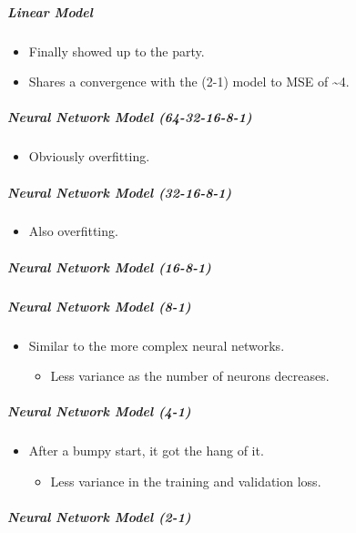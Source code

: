 \documentclass[11pt]{article}
\providecommand{\tightlist}{%
      \setlength{\itemsep}{0pt}\setlength{\parskip}{0pt}}
\begin{document}
\subparagraph{Linear Model}\label{linear-model}

\begin{itemize}
\tightlist
\item
  Finally showed up to the party.
\item
  Shares a convergence with the (2-1) model to MSE of \textasciitilde4.
\end{itemize}

\subparagraph{Neural Network Model
(64-32-16-8-1)}\label{neural-network-model-64-32-16-8-1}

\begin{itemize}
\tightlist
\item
  Obviously overfitting.
\end{itemize}

\subparagraph{Neural Network Model
(32-16-8-1)}\label{neural-network-model-32-16-8-1}

\begin{itemize}
\tightlist
\item
  Also overfitting.
\end{itemize}

\subparagraph{Neural Network Model
(16-8-1)}\label{neural-network-model-16-8-1}

\subparagraph{Neural Network Model
(8-1)}\label{neural-network-model-8-1}

\begin{itemize}
\tightlist
\item
  Similar to the more complex neural networks.

  \begin{itemize}
  \tightlist
  \item
    Less variance as the number of neurons decreases.
  \end{itemize}
\end{itemize}

\subparagraph{Neural Network Model
(4-1)}\label{neural-network-model-4-1}

\begin{itemize}
\tightlist
\item
  After a bumpy start, it got the hang of it.

  \begin{itemize}
  \tightlist
  \item
    Less variance in the training and validation loss.
  \end{itemize}
\end{itemize}

\subparagraph{Neural Network Model
(2-1)}\label{neural-network-model-2-1}
\end{document}
